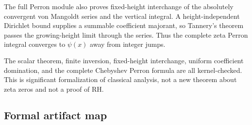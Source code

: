 \documentclass[11pt,a4paper]{article}
\begin{document}
The full Perron module also proves fixed-height interchange of the absolutely
convergent von Mangoldt series and the vertical integral. A
height-independent Dirichlet bound supplies a summable coefficient majorant,
so Tannery's theorem passes the growing-height limit through the series. Thus
the complete zeta Perron integral converges to $\psi(x)$ away from integer
jumps.

\begin{resultbox}
The scalar theorem, finite inversion, fixed-height interchange, uniform
coefficient domination, and the complete Chebyshev Perron formula are all
kernel-checked. This is significant formalization of classical analysis, not
a new theorem about zeta zeros and not a proof of RH.
\end{resultbox}

\subsection{Formal artifact map}
\end{document}
